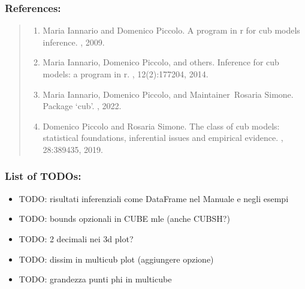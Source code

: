 \documentclass[letterpaper,10pt,english]{sphinxmanual}
\begin{document}
\subsubsection{References:}
\label{\detokenize{cubmods:id886}}\begin{quote}
\begin{enumerate}
%
\setcounter{enumi}{0}
\item {} 
\sphinxAtStartPar
Maria Iannario and Domenico Piccolo. A program in r for cub models inference. , 2009.

\item {} 
\sphinxAtStartPar
Maria Iannario, Domenico Piccolo, and others. Inference for cub models: a program in r. , 12(2):177\textendash{}204, 2014.

\item {} 
\sphinxAtStartPar
Maria Iannario, Domenico Piccolo, and Maintainer Rosaria Simone. Package ‘cub’. , 2022.

\item {} 
\sphinxAtStartPar
Domenico Piccolo and Rosaria Simone. The class of cub models: statistical foundations, inferential issues and empirical evidence. , 28:389\textendash{}435, 2019.

\end{enumerate}
\end{quote}


\subsubsection{List of TODOs:}
\label{\detokenize{cubmods:id924}}\begin{itemize}
\item {} 
\sphinxAtStartPar
TODO: risultati inferenziali come DataFrame nel Manuale e negli esempi

\item {} 
\sphinxAtStartPar
TODO: bounds opzionali in CUBE mle (anche CUBSH?)

\item {} 
\sphinxAtStartPar
TODO: 2 decimali nei 3d plot?

\item {} 
\sphinxAtStartPar
TODO: dissim in multicub plot (aggiungere opzione)

\item {} 
\sphinxAtStartPar
TODO: grandezza punti phi in multicube

\end{itemize}
\end{document}
